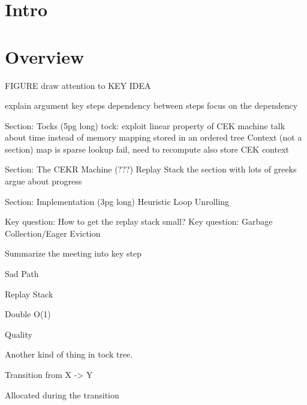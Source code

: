 \documentclass[acmsmall]{acmart}
\begin{document}
		
	
	
	\maketitle
	\section{Intro}
	\section{Overview}	
	FIGURE draw attention to KEY IDEA

explain argument
key steps
dependency between steps
focus on the dependency

Section: Tocks (5pg long)
tock: exploit linear property of CEK machine
talk about time instead of memory
mapping stored in an ordered tree
Context (not a section)
map is sparse
lookup fail, need to recompute
also store CEK context

Section: The CEKR Machine (???)
Replay Stack
the section with lots of greeks
argue about progress

Section: Implementation (3pg long)
Heuristic
Loop Unrolling

Key question: How to get the replay stack small?
Key question: Garbage Collection/Eager Eviction

Summarize the meeting into key step

Sad Path

Replay Stack

Double O(1)

Quality


Another kind of thing in tock tree.

Transition from X -> Y

Allocated during the transition
\end{document}
